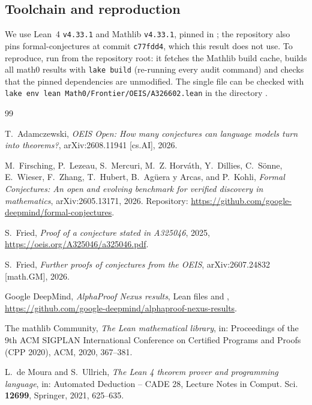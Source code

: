 \documentclass[11pt]{amsart}
\theoremstyle{plain}
\theoremstyle{definition}
\begin{document}
\subsection*{Toolchain and reproduction}
We use Lean~4 \cite{Lean4} \texttt{v4.33.1} and Mathlib \cite{Mathlib} \texttt{v4.33.1}, pinned in ; the repository also pins formal-conjectures \cite{FC} at commit \texttt{c77fdd4}, which this result does not use.
To reproduce, run  from the repository root: it fetches the Mathlib build cache, builds all math0 results with \texttt{lake build} (re-running every audit command) and checks that the pinned dependencies are unmodified. The single file can be checked with \texttt{lake env lean Math0/Frontier/OEIS/A326602.lean} in the directory .

\begin{small}
\begin{thebibliography}{99}

T.~Adamczewski, \emph{OEIS Open: How many conjectures can language models turn into theorems?}, arXiv:2608.11941 [cs.AI], 2026.

M.~Firsching, P.~Lezeau, S.~Mercuri, M.~Z. Horv\'ath, Y.~Dillies, C.~S\"onne, E.~Wieser, F.~Zhang, T.~Hubert, B.~Ag\"uera y Arcas, and P.~Kohli, \emph{Formal Conjectures: An open and evolving benchmark for verified discovery in mathematics}, arXiv:2605.13171, 2026. Repository: \url{https://github.com/google-deepmind/formal-conjectures}.

S.~Fried, \emph{Proof of a conjecture stated in A325046}, 2025, \url{https://oeis.org/A325046/a325046.pdf}.

S.~Fried, \emph{Further proofs of conjectures from the OEIS}, arXiv:2607.24832 [math.GM], 2026.

Google DeepMind, \emph{AlphaProof Nexus results}, Lean files  and , \url{https://github.com/google-deepmind/alphaproof-nexus-results}.

The mathlib Community, \emph{The Lean mathematical library}, in: Proceedings of the 9th ACM SIGPLAN International Conference on Certified Programs and Proofs (CPP 2020), ACM, 2020, 367--381.

L.~de Moura and S.~Ullrich, \emph{The Lean 4 theorem prover and programming language}, in: Automated Deduction -- CADE 28, Lecture Notes in Comput. Sci. \textbf{12699}, Springer, 2021, 625--635.


\end{thebibliography}
\end{small}
\end{document}
